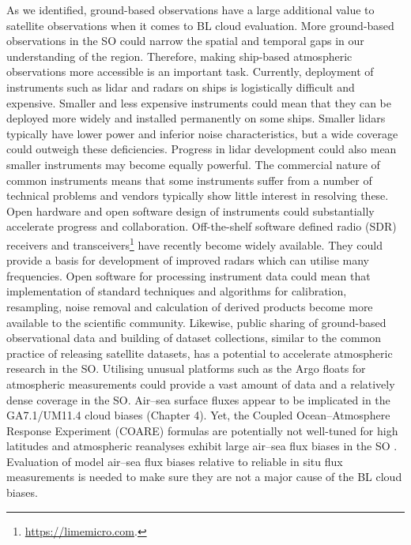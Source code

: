 As we identified, ground-based observations have a large additional value
to satellite observations when it comes to BL cloud evaluation. More
ground-based observations in the SO could narrow the spatial and temporal gaps
in our understanding of the region. Therefore, making ship-based atmospheric
observations more accessible is an important task. Currently, deployment
of instruments such as lidar and radars on ships is logistically difficult
and expensive. Smaller and less expensive instruments could mean that they
can be deployed more widely and installed permanently on some ships. Smaller
lidars typically have lower power and inferior noise characteristics,
but a wide coverage could outweigh these deficiencies. Progress in lidar
development could also mean smaller instruments may become equally powerful.
The commercial nature of common instruments means that some instruments
suffer from a number of technical problems and vendors typically show
little interest in resolving these. Open hardware and open software design of
instruments could substantially accelerate progress and collaboration.
Off-the-shelf software defined radio (SDR) receivers and
transceivers\footnote{\url{https://limemicro.com}.} have recently
become widely available. They could provide a basis for development of improved
radars which can utilise many frequencies. Open software for processing
instrument data could mean that implementation of standard techniques and
algorithms for calibration, resampling, noise removal and calculation of derived
products become more available to the scientific community. Likewise,
public sharing of ground-based observational data and building of dataset
collections, similar to the common practice of releasing satellite datasets,
has a potential to accelerate atmospheric research in the SO.
Utilising unusual platforms such as the Argo floats \citep{roemmich2009}
for atmospheric measurements could provide a vast amount of data and a relatively dense
coverage in the SO.
Air--sea surface fluxes appear to be implicated in the GA7.1/UM11.4 cloud biases
(Chapter 4). Yet, the Coupled Ocean–Atmosphere Response Experiment (COARE)
formulas are potentially not well-tuned for high latitudes and atmospheric
reanalyses exhibit large air--sea flux biases in the SO
\citep{cerovevcki2011}. Evaluation of model air--sea flux biases relative to
reliable in situ flux measurements is needed to make sure they are not
a major cause of the BL cloud biases.

